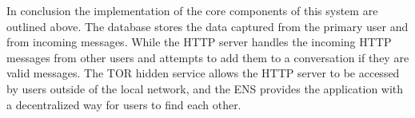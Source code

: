 \documentclass[../main/main.tex]{subfiles}
\begin{document}
In conclusion the implementation of the core components of this system are outlined above. The database stores the data captured from the primary user and from incoming messages. 
While the HTTP server handles the incoming HTTP messages from other users and attempts to add them to a conversation if they are valid messages. 
The TOR hidden service allows the HTTP server to be accessed by users outside of the local network, and the ENS provides the application with a decentralized way for users to find each other. 
\end{document}
